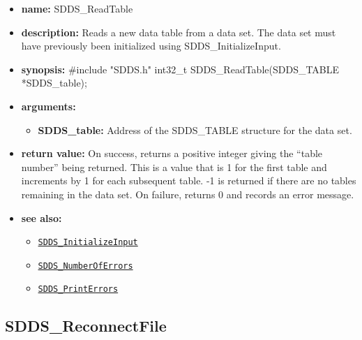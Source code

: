 \documentclass[11pt]{article}
\newcommand{\progref}[1]{\hyperref[SDDS_#1]{\tt SDDS\_#1}}
\begin{document}
\begin{itemize}
\item {\bf name:}\newline
SDDS\_ReadTable
\item {\bf description:}\newline
Reads a new data table from a data set. The data set must have previously been initialized using SDDS\_InitializeInput.
\item {\bf synopsis:} \#include "SDDS.h"\newline
int32\_t SDDS\_ReadTable(SDDS\_TABLE *SDDS\_table);
\item {\bf arguments:}
\begin{itemize}
\item {\bf SDDS\_table:} Address of the SDDS\_TABLE structure for the data set.
\end{itemize}
\item {\bf return value:}\newline
On success, returns a positive integer giving the ``table number'' being returned. This is a value that is 1 for the first table and increments by 1 for each subsequent table. -1 is returned if there are no tables remaining in the data set.\newline
\newline
On failure, returns 0 and records an error message. 
\item {\bf see also:}
\begin{itemize}
\item \progref{InitializeInput}
\item \progref{NumberOfErrors}
\item \progref{PrintErrors}
\end{itemize}
\end{itemize}

\subsection{SDDS\_ReconnectFile}
\label{SDDS_ReconnectFile}
\end{document}
